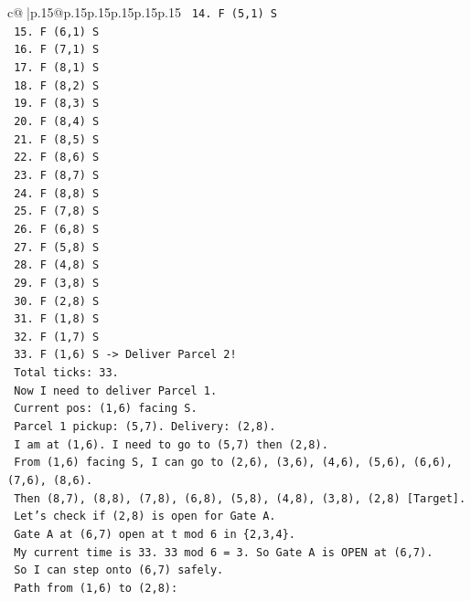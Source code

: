 \documentclass{article}
\begin{document}
{\begin{supertabular}{c@{$\;$}|p{.15\linewidth}@{}p{.15\linewidth}p{.15\linewidth}p{.15\linewidth}p{.15\linewidth}p{.15\linewidth}}
{{{\texttt{    14. F (5,1) S} \\
\texttt{    15. F (6,1) S} \\
\texttt{    16. F (7,1) S} \\
\texttt{    17. F (8,1) S} \\
\texttt{    18. F (8,2) S} \\
\texttt{    19. F (8,3) S} \\
\texttt{    20. F (8,4) S} \\
\texttt{    21. F (8,5) S} \\
\texttt{    22. F (8,6) S} \\
\texttt{    23. F (8,7) S} \\
\texttt{    24. F (8,8) S} \\
\texttt{    25. F (7,8) S} \\
\texttt{    26. F (6,8) S} \\
\texttt{    27. F (5,8) S} \\
\texttt{    28. F (4,8) S} \\
\texttt{    29. F (3,8) S} \\
\texttt{    30. F (2,8) S} \\
\texttt{    31. F (1,8) S} \\
\texttt{    32. F (1,7) S} \\
\texttt{    33. F (1,6) S {-}> Deliver Parcel 2!} \\
\texttt{    Total ticks: 33.} \\
\texttt{    Now I need to deliver Parcel 1.} \\
\texttt{    Current pos: (1,6) facing S.} \\
\texttt{    Parcel 1 pickup: (5,7). Delivery: (2,8).} \\
\texttt{    I am at (1,6). I need to go to (5,7) then (2,8).} \\
\texttt{    From (1,6) facing S, I can go to (2,6), (3,6), (4,6), (5,6), (6,6), (7,6), (8,6).} \\
\texttt{    Then (8,7), (8,8), (7,8), (6,8), (5,8), (4,8), (3,8), (2,8) {[}Target{]}.} \\
\texttt{    Let's check if (2,8) is open for Gate A.} \\
\texttt{    Gate A at (6,7) open at t mod 6 in \{2,3,4\}.} \\
\texttt{    My current time is 33. 33 mod 6 = 3. So Gate A is OPEN at (6,7).} \\
\texttt{    So I can step onto (6,7) safely.} \\
\texttt{    Path from (1,6) to (2,8):} \\
}}}
\end{supertabular}}
\end{document}
